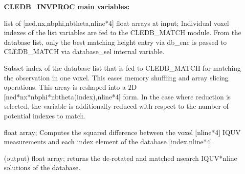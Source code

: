 \documentclass{article}
\begin{document}
\textbf{CLEDB\_INVPROC main variables:}
\begin{description}
    [font=\normalfont,leftmargin=1.3in,style=multiline]
    \item[database]
        list of [ned,nx,nbphi,nbtheta,nline*4] float arrays at input; Individual voxel indexes of the list variables are fed to the CLEDB\_MATCH module. From the database list, only the best matching height entry via db\_enc is passed to CLEDB\_MATCH via database\_sel internal variable. 
	\item[database\_sel]  
        Subset index of the database list that is fed to CLEDB\_MATCH for matching the observation in one voxel. This eases memory shuffling and array slicing operations. This array is reshaped into a 2D  [ned*nx*nbphi*nbtheta(index),nline*4] form. In the case where reduction is selected, the variable is additionally reduced with respect to the number of potential indexes to match. 
    \item[chisq]
        [ned*nx*nbphi*nbtheta,nline*4] float array; Computes the squared difference between the voxel [nline*4] IQUV measurements and each index element of the database [index,nline*4].
    \item[sfound]
        [nx,ny,nsearch,nline*4] (output) float array; returns the de-rotated and matched nsearch IQUV*nline solutions of the database.
        

\end{description}
\end{document}
